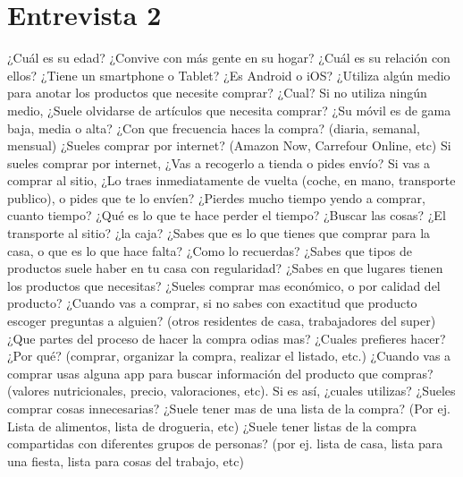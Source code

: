 \section{Entrevista 2}
\begin{description}
    \preg ¿Cuál es su edad?
    \preg ¿Convive con más gente en su hogar? ¿Cuál es su relación con ellos?
    \preg ¿Tiene un smartphone o Tablet? ¿Es Android o iOS?
    \preg ¿Utiliza algún medio para anotar los productos que necesite comprar? ¿Cual?
    \preg Si no utiliza ningún medio, ¿Suele olvidarse de artículos que necesita comprar?
    \preg ¿Su móvil es de gama baja, media o alta?
    \preg ¿Con que frecuencia haces la compra? (diaria, semanal, mensual)
    \preg ¿Sueles comprar por internet? (Amazon Now, Carrefour Online, etc)
    \preg Si sueles comprar por internet, ¿Vas a recogerlo a tienda o pides envío?
    \preg Si vas a comprar al sitio, ¿Lo traes inmediatamente de vuelta (coche, en mano, transporte publico), o pides que te lo envíen?
    \preg ¿Pierdes mucho tiempo yendo a comprar, cuanto tiempo?
    \preg ¿Qué es lo que te hace perder el tiempo? ¿Buscar las cosas? ¿El transporte al sitio? ¿la caja?
    \preg ¿Sabes que es lo que tienes que comprar para la casa, o que es lo que hace falta? ¿Como lo recuerdas?
    \preg ¿Sabes que tipos de productos suele haber en tu casa con regularidad?
    \preg ¿Sabes en que lugares tienen los productos que necesitas?
    \preg ¿Sueles comprar mas económico, o por calidad del producto?
    \preg ¿Cuando vas a comprar, si no sabes con exactitud que producto escoger preguntas a alguien? (otros residentes de casa, trabajadores del super)
    \preg ¿Que partes del proceso de hacer la compra odias mas? ¿Cuales prefieres hacer? ¿Por qué? (comprar, organizar la compra, realizar el listado, etc.)
    \preg ¿Cuando vas a comprar usas alguna app para buscar información del producto que compras? (valores nutricionales, precio, valoraciones, etc). Si es así, ¿cuales utilizas?
    \preg ¿Sueles comprar cosas innecesarias?
    \preg ¿Suele tener mas de una lista de la compra? (Por ej. Lista de alimentos, lista de drogueria, etc) 
    \preg ¿Suele tener listas de la compra compartidas con diferentes grupos de personas? (por ej. lista de casa, lista para una fiesta, lista para cosas del trabajo, etc)
\end{description}

